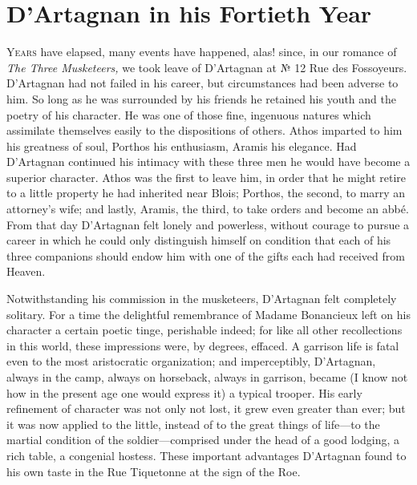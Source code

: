 \chapter{D'Artagnan in his Fortieth Year}

 \lettrine{Y}{ears} have elapsed, many events have happened, alas! since, in our romance of \textit{The Three Musketeers,} we took leave of D'Artagnan at № 12 Rue des Fossoyeurs. D'Artagnan had not failed in his career, but circumstances had been adverse to him. So long as he was surrounded by his friends he retained his youth and the poetry of his character. He was one of those fine, ingenuous natures which assimilate themselves easily to the dispositions of others. Athos imparted to him his greatness of soul, Porthos his enthusiasm, Aramis his elegance. Had D'Artagnan continued his intimacy with these three men he would have become a superior character. Athos was the first to leave him, in order that he might retire to a little property he had inherited near Blois; Porthos, the second, to marry an attorney's wife; and lastly, Aramis, the third, to take orders and become an abbé. From that day D'Artagnan felt lonely and powerless, without courage to pursue a career in which he could only distinguish himself on condition that each of his three companions should endow him with one of the gifts each had received from Heaven.

Notwithstanding his commission in the musketeers, D'Artagnan felt completely solitary. For a time the delightful remembrance of Madame Bonancieux left on his character a certain poetic tinge, perishable indeed; for like all other recollections in this world, these impressions were, by degrees, effaced. A garrison life is fatal even to the most aristocratic organization; and imperceptibly, D'Artagnan, always in the camp, always on horseback, always in garrison, became (I know not how in the present age one would express it) a typical trooper. His early refinement of character was not only not lost, it grew even greater than ever; but it was now applied to the little, instead of to the great things of life—to the martial condition of the soldier—comprised under the head of a good lodging, a rich table, a congenial hostess. These important advantages D'Artagnan found to his own taste in the Rue Tiquetonne at the sign of the Roe.

